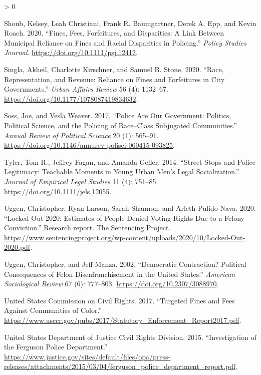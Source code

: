 \documentclass[
  12pt,
]{article}
\newlength{\cslhangindent}
\newenvironment{CSLReferences}[2] %
 {%
  \setlength{\parindent}{0pt}
  \ifodd #1 \everypar{\setlength{\hangindent}{\cslhangindent}}\ignorespaces\fi
  \ifnum #2 > 0
  \setlength{\parskip}{#2\baselineskip}
  \fi
 }%
 {}
\begin{document}
\begin{CSLReferences}{1}{0}
\leavevmode\hypertarget{ref-Shoub2020}{}%
Shoub, Kelsey, Leah Christiani, Frank R. Baumgartner, Derek A. Epp, and Kevin Roach. 2020. {``Fines, {Fees}, {Forfeitures}, and {Disparities}: {A Link Between Municipal Reliance} on {Fines} and {Racial Disparities} in {Policing}.''} \emph{Policy Studies Journal}. \url{https://doi.org/10.1111/psj.12412}.

\leavevmode\hypertarget{ref-Singla2020}{}%
Singla, Akheil, Charlotte Kirschner, and Samuel B. Stone. 2020. {``Race, {Representation}, and {Revenue}: {Reliance} on {Fines} and {Forfeitures} in {City Governments}.''} \emph{Urban Affairs Review} 56 (4): 1132--67. \url{https://doi.org/10.1177/1078087419834632}.

\leavevmode\hypertarget{ref-Soss2017}{}%
Soss, Joe, and Vesla Weaver. 2017. {``Police {Are Our Government}: {Politics}, {Political Science}, and the {Policing} of {Race}--{Class Subjugated Communities}.''} \emph{Annual Review of Political Science} 20 (1): 565--91. \url{https://doi.org/10.1146/annurev-polisci-060415-093825}.

\leavevmode\hypertarget{ref-Tyler2014}{}%
Tyler, Tom R., Jeffrey Fagan, and Amanda Geller. 2014. {``Street {Stops} and {Police Legitimacy}: {Teachable Moments} in {Young Urban Men}'s {Legal Socialization}.''} \emph{Journal of Empirical Legal Studies} 11 (4): 751--85. \url{https://doi.org/10.1111/jels.12055}.

\leavevmode\hypertarget{ref-Uggen2020}{}%
Uggen, Christopher, Ryan Larson, Sarah Shannon, and Arleth Pulido-Nava. 2020. {``Locked {Out} 2020: {Estimates} of {People Denied Voting Rights Due} to a {Felony Conviction}.''} Research report. {The Sentencing Project}. \url{https://www.sentencingproject.org/wp-content/uploads/2020/10/Locked-Out-2020.pdf}.

\leavevmode\hypertarget{ref-Uggen2002}{}%
Uggen, Christopher, and Jeff Manza. 2002. {``Democratic {Contraction}? {Political Consequences} of {Felon Disenfranchisement} in the {United States}.''} \emph{American Sociological Review} 67 (6): 777--803. \url{https://doi.org/10.2307/3088970}.

\leavevmode\hypertarget{ref-UnitedStatesCommissiononCivilRights2017}{}%
United States Commission on Civil Rights. 2017. {``Targeted {Fines} and {Fees Against Communities} of {Color}.''} \url{https://www.usccr.gov/pubs/2017/Statutory_Enforcement_Report2017.pdf}.

\leavevmode\hypertarget{ref-UnitedStatesDepartmentofJusticeCivilRightsDivision2015}{}%
United States Department of Justice Civil Rights Division. 2015. {``Investigation of the {Ferguson Police Department}.''} \url{https://www.justice.gov/sites/default/files/opa/press-releases/attachments/2015/03/04/ferguson_police_department_report.pdf}.


\end{CSLReferences}
\end{document}
